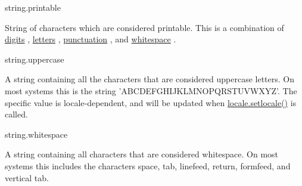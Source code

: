 \documentclass[a4paper,12pt]{report}
\begin{document}
\noindent 
string.printable \par
String of characters which are considered printable. This is a combination of \href{https://docs.python.org/2/library/string.html}{digits}
, \href{https://docs.python.org/2/library/string.html}{letters}
, \href{https://docs.python.org/2/library/string.html}{punctuation}
, and \href{https://docs.python.org/2/library/string.html}{whitespace}
. \par
\noindent 
string.uppercase \par
A string containing all the characters that are considered uppercase letters. On most systems this is the string 'ABCDEFGHIJKLMNOPQRSTUVWXYZ'. The specific value is locale-dependent, and will be updated when \href{https://docs.python.org/2/library/locale.html}{locale.setlocale()}
 is called. \par
\noindent 
string.whitespace \par
A string containing all characters that are considered whitespace. On most systems this includes the characters space, tab, linefeed, return, formfeed, and vertical tab. \par
\noindent 
\end{document}
